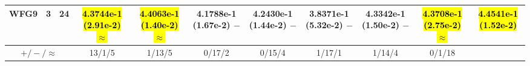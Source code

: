 \documentclass[journal]{IEEEtran}
\begin{document}
\begin{table*}[htbp]
\begin{tabular}{ccccccccccc}
\hline
\multirow{1}{*}{WFG9}&3&24&\hl{4.3744e-1 (2.91e-2) $\approx$}&\hl{4.4063e-1 (1.40e-2) $\approx$}&4.1788e-1 (1.67e-2) $-$&4.2430e-1 (1.44e-2) $-$&3.8371e-1 (5.32e-2) $-$&4.3342e-1 (1.50e-2) $-$&\hl{4.3708e-1 (2.75e-2) $\approx$}&\hl{4.4541e-1 (1.52e-2)}\\
\hline
\multicolumn{3}{c}{$+/-/\approx$}&13/1/5&1/13/5&0/17/2&0/15/4&1/17/1&1/14/4&0/1/18&\\
\bottomrule
\end{tabular}
\label{No Label}
\end{table*}
\end{document}
